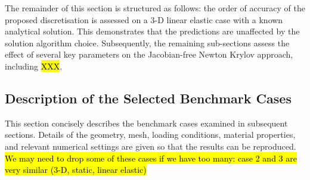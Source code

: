 \documentclass[sn-mathphys,Numbered,draft]{sn-jnl}%
\begin{document}
The remainder of this section is structured as follows:
the order of accuracy of the proposed discretisation is assessed on a 3-D linear elastic case with a known analytical solution.
This demonstrates that the predictions are unaffected by the solution algorithm choice.
Subsequently, the remaining sub-sections assess the effect of several key parameters on the Jacobian-free Newton Krylov approach, including \hl{XXX}.


\subsection{Description of the Selected Benchmark Cases}
\label{sec:case_descriptions}


This section concisely describes the benchmark cases examined in subsequent sections.
Details of the geometry, mesh, loading conditions, material properties, and relevant numerical settings are given so that the results can be reproduced.
\hl{We may need to drop some of these cases if we have too many: case 2 and 3 are very similar (3-D, static, linear elastic)}
 
\end{document}

